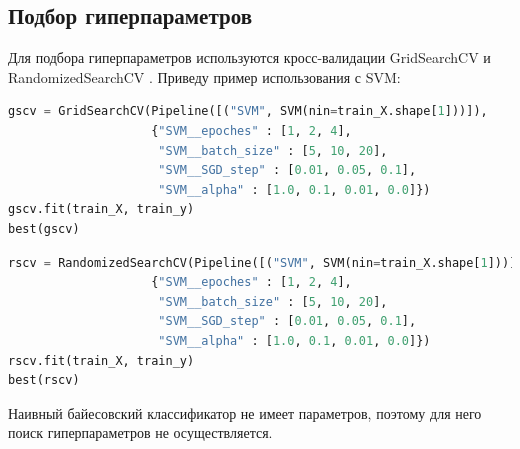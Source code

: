 \subsection{Подбор гиперпараметров}
Для подбора гиперпараметров используются кросс-валидации GridSearchCV \cite{scikit-grid} и RandomizedSearchCV \cite{scikit-rand}. 
Приведу пример использования с SVM:
\begin{lstlisting}[language=Python]
gscv = GridSearchCV(Pipeline([("SVM", SVM(nin=train_X.shape[1]))]),
                    {"SVM__epoches" : [1, 2, 4],
                     "SVM__batch_size" : [5, 10, 20],
                     "SVM__SGD_step" : [0.01, 0.05, 0.1],
                     "SVM__alpha" : [1.0, 0.1, 0.01, 0.0]})
gscv.fit(train_X, train_y)
best(gscv)
\end{lstlisting}
\begin{lstlisting}[language=Python]
rscv = RandomizedSearchCV(Pipeline([("SVM", SVM(nin=train_X.shape[1]))]),
                    {"SVM__epoches" : [1, 2, 4],
                     "SVM__batch_size" : [5, 10, 20],
                     "SVM__SGD_step" : [0.01, 0.05, 0.1],
                     "SVM__alpha" : [1.0, 0.1, 0.01, 0.0]})
rscv.fit(train_X, train_y)
best(rscv)
\end{lstlisting}

Наивный байесовский классификатор не имеет параметров, поэтому для него поиск гиперпараметров не осуществляется.
\pagebreak
